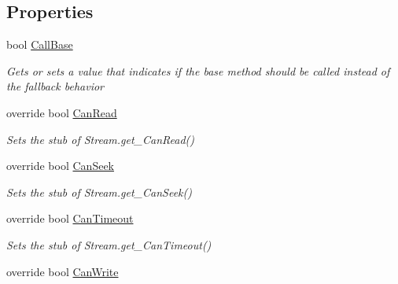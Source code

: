 \subsection*{Properties}
\begin{DoxyCompactItemize}
\item 
bool \hyperlink{class_system_1_1_net_1_1_security_1_1_fakes_1_1_stub_authenticated_stream_a21586a3efea86e8c922fcb2e94c8fad2}{Call\-Base}
\begin{DoxyCompactList}\small\item\em Gets or sets a value that indicates if the base method should be called instead of the fallback behavior\end{DoxyCompactList}\item 
override bool \hyperlink{class_system_1_1_net_1_1_security_1_1_fakes_1_1_stub_authenticated_stream_a21d5ea90b29a895479bd59aff21a911f}{Can\-Read}
\begin{DoxyCompactList}\small\item\em Sets the stub of Stream.\-get\-\_\-\-Can\-Read()\end{DoxyCompactList}\item 
override bool \hyperlink{class_system_1_1_net_1_1_security_1_1_fakes_1_1_stub_authenticated_stream_a844b64d899b8dc8058b8b5b14b96e38e}{Can\-Seek}
\begin{DoxyCompactList}\small\item\em Sets the stub of Stream.\-get\-\_\-\-Can\-Seek()\end{DoxyCompactList}\item 
override bool \hyperlink{class_system_1_1_net_1_1_security_1_1_fakes_1_1_stub_authenticated_stream_a4f6f74cf4fdf05dcd34143aa3d562b4b}{Can\-Timeout}
\begin{DoxyCompactList}\small\item\em Sets the stub of Stream.\-get\-\_\-\-Can\-Timeout()\end{DoxyCompactList}\item 
override bool \hyperlink{class_system_1_1_net_1_1_security_1_1_fakes_1_1_stub_authenticated_stream_a0b96e56655fa22ceaba6168dc1fa99e3}{Can\-Write}

\end{DoxyCompactItemize}

